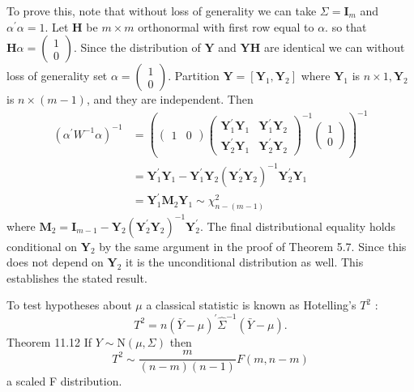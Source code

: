 \documentclass[10pt]{article}
\begin{document}
To prove this, note that without loss of generality we can take $\Sigma=\boldsymbol{I}_{m}$ and $\alpha^{\prime} \alpha=1$. Let $\boldsymbol{H}$ be $m \times m$ orthonormal with first row equal to $\alpha$. so that $\boldsymbol{H} \alpha=\left(\begin{array}{l}1 \\ 0\end{array}\right)$. Since the distribution of $\boldsymbol{Y}$ and $\boldsymbol{Y} \boldsymbol{H}$ are identical we can without loss of generality set $\alpha=\left(\begin{array}{c}1 \\ 0\end{array}\right)$. Partition $\boldsymbol{Y}=\left[\boldsymbol{Y}_{1}, \boldsymbol{Y}_{2}\right]$ where $\boldsymbol{Y}_{1}$ is $n \times 1, \boldsymbol{Y}_{2}$ is $n \times(m-1)$, and they are independent. Then
$$
\begin{aligned}
\left(\alpha^{\prime} W^{-1} \alpha\right)^{-1} &=\left(\left(\begin{array}{ll}
1 & 0
\end{array}\right)\left(\begin{array}{cc}
\boldsymbol{Y}_{1}^{\prime} \boldsymbol{Y}_{1} & \boldsymbol{Y}_{1}^{\prime} \boldsymbol{Y}_{2} \\
\boldsymbol{Y}_{2}^{\prime} \boldsymbol{Y}_{1} & \boldsymbol{Y}_{2}^{\prime} \boldsymbol{Y}_{2}
\end{array}\right)^{-1}\left(\begin{array}{l}
1 \\
0
\end{array}\right)\right)^{-1} \\
&=\boldsymbol{Y}_{1}^{\prime} \boldsymbol{Y}_{1}-\boldsymbol{Y}_{1}^{\prime} \boldsymbol{Y}_{2}\left(\boldsymbol{Y}_{2}^{\prime} \boldsymbol{Y}_{2}\right)^{-1} \boldsymbol{Y}_{2}^{\prime} \boldsymbol{Y}_{1} \\
&=\boldsymbol{Y}_{1}^{\prime} \boldsymbol{M}_{2} \boldsymbol{Y}_{1} \sim \chi_{n-(m-1)}^{2}
\end{aligned}
$$
where $\boldsymbol{M}_{2}=\boldsymbol{I}_{m-1}-\boldsymbol{Y}_{2}\left(\boldsymbol{Y}_{2}^{\prime} \boldsymbol{Y}_{2}\right)^{-1} \boldsymbol{Y}_{2}^{\prime}$. The final distributional equality holds conditional on $\boldsymbol{Y}_{2}$ by the same argument in the proof of Theorem 5.7. Since this does not depend on $\boldsymbol{Y}_{2}$ it is the unconditional distribution as well. This establishes the stated result.

To test hypotheses about $\mu$ a classical statistic is known as Hotelling's $T^{2}$ :
$$
T^{2}=n(\bar{Y}-\mu)^{\prime} \widehat{\Sigma}^{-1}(\bar{Y}-\mu) .
$$
Theorem 11.12 If $Y \sim \mathrm{N}(\mu, \Sigma)$ then
$$
T^{2} \sim \frac{m}{(n-m)(n-1)} F(m, n-m)
$$
a scaled F distribution.
\end{document}

